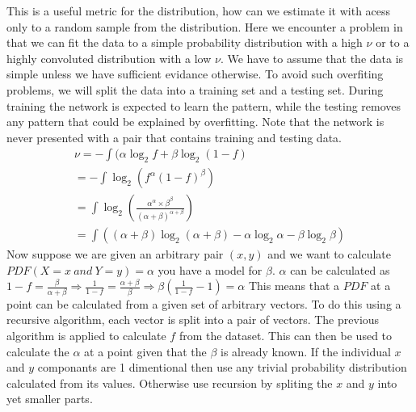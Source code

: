 \documentclass[12pt]{article}
\begin{document}
This is a useful metric for the distribution, how can we estimate it with acess only to a random sample from the distribution. Here we encounter a problem in that we can fit the data to a simple probability distribution with a high $\nu$ or to a highly convoluted distribution with a low $\nu$.
We have to assume that the data is simple unless we have sufficient evidance otherwise.
To avoid such overfiting problems, we will split the data into a training set and a testing set. During training the network is expected to learn the pattern, while the testing removes any pattern that could be explained by overfitting. Note that the network is never presented with a pair that contains training and testing data.
\begin{eqnarray}
\nu=-\int (\alpha\log_2f+\beta\log_2(1-f)\\=-\int \log_2(f^\alpha(1-f)^\beta)\\=\int \log_2(\frac{\alpha^\alpha \times \beta^\beta}{(\alpha+\beta)^{\alpha+\beta}})\\=\int((\alpha+\beta)\log_2(\alpha+\beta)-\alpha \log_2 \alpha-\beta \log_2 \beta)
\end{eqnarray}
Now suppose we are given an arbitrary pair $(x,y)$ and we want to calculate $PDF(X=x \ and \ Y=y)=\alpha$ you have a model for $\beta$. $\alpha$ can be calculated as $1-f=\frac{\beta}{\alpha+\beta}\Rightarrow\frac{1}{1-f}=\frac{\alpha+\beta}{\beta}\Rightarrow \beta(\frac{1}{1-f}-1)=\alpha$
This means that a $PDF$ at a point can be calculated from a given set of arbitrary vectors. To do this using a recursive algorithm, each vector is split into a pair of vectors. The previous algorithm is applied to calculate $f$ from the dataset. This can then be used to calculate the $\alpha$ at a point given that the $\beta$ is already known. If the individual $x$ and $y$ componants are 1 dimentional then use any trivial probability distribution calculated from its values. Otherwise use recursion by spliting the $x$ and $y$ into yet smaller parts.
\end{document}
